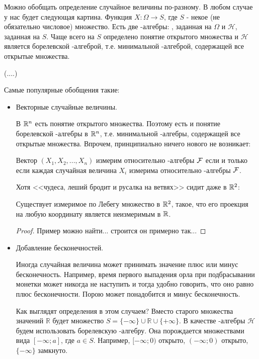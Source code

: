 {Можно обобщать определение случайное величины по-разному. В любом случае у нас будет следующая картина. Функция $X:\Omega\to S$, где $S$ - некое (не обязательно числовое) множество. Есть две \s-алгебры: \F, заданная на $\Omega$ и $\mathcal{H}$, заданная на $S$. Чаще всего на $S$ определено понятие открытого множества и $\mathcal{H}$ является борелевской \s-алгеброй, т.е. минимальной \s-алгеброй, содержащей все открытые множества.


(....)

Самые популярные обобщения такие:

\begin{itemize}

\item Векторные случайные величины.

В $\mathbb{R}^{n}$ есть понятие открытого множества. Поэтому есть и понятие борелевской \s-алгебры в $\mathbb{R}^{n}$, т.е. минимальной \s-алгебры, содержащей все открытые множества. Впрочем, принципиально ничего нового не возникает:

\begin{myth}
Вектор $(X_{1},X_{2},..., X_{n})$ измерим относительно \s-алгебры $\mathcal{F}$ если и только если каждая случайная величина $X_{i}$ измерима относительно \s-алгебры $\mathcal{F}$.
\end{myth}

Хотя <<чудеса, леший бродит и русалка на ветвях>> сидит даже в $\mathbb{R}^{2}$:
\begin{myth}
Существует измеримое по Лебегу множество в $\mathbb{R}^{2}$, такое, что его проекция на любую координату является неизмеримым в $\mathbb{R}$.
\end{myth}

\begin{proof}
Пример можно найти... строится он примерно так...
\end{proof}

\item Добавление бесконечностей. 

Иногда случайная величина может принимать значение плюс или минус бесконечность. Например, время первого выпадения орла при подбрасывании монетки может никогда не наступить и тогда удобно говорить, что оно равно плюс бесконечности. Порою может понадобится и минус бесконечность. 

Как выглядят определения в этом случаем? Вместо старого множества значений $\mathbb{R}$ будет множество $S=\{-\infty\}\cup \mathbb{R}\cup\{+\infty\}$. В качестве \s-алгебры $\mathcal{H}$ будем использовать борелевскую \s-алгебру. Она порождается множествами вида $[-\infty;a]$, где $a\in S$. Например, $[-\infty;0)$ открыто, $(-\infty;0)$ открыто, $\{-\infty\}$ замкнуто.



\end{itemize}}
